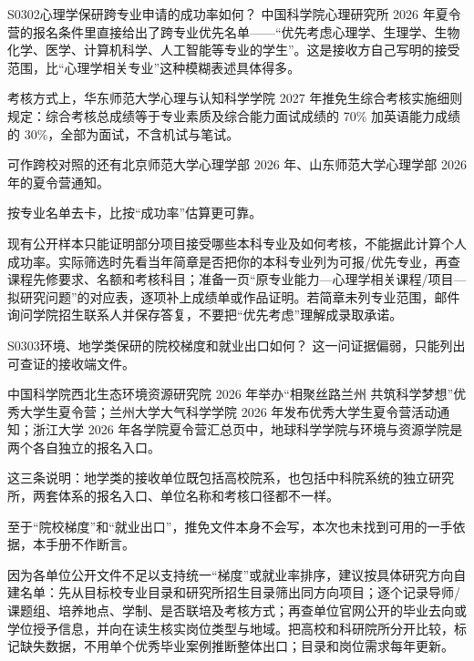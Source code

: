 \begin{qa}{S0302}{心理学保研跨专业申请的成功率如何？}
中国科学院心理研究所 2026 年夏令营的报名条件里直接给出了跨专业优先名单——“优先考虑心理学、生理学、生物化学、医学、计算机科学、人工智能等专业的学生”。这是接收方自己写明的接受范围，比“心理学相关专业”这种模糊表述具体得多。

考核方式上，华东师范大学心理与认知科学学院 2027 年推免生综合考核实施细则规定：综合考核总成绩等于专业素质及综合能力面试成绩的 70\% 加英语能力成绩的 30\%，全部为面试，不含机试与笔试。

可作跨校对照的还有北京师范大学心理学部 2026 年、山东师范大学心理学部 2026 年的夏令营通知。

按专业名单去卡，比按“成功率”估算更可靠。

现有公开样本只能证明部分项目接受哪些本科专业及如何考核，不能据此计算个人成功率。实际筛选时先看当年简章是否把你的本科专业列为可报/优先专业，再查课程先修要求、名额和考核科目；准备一页“原专业能力—心理学相关课程/项目—拟研究问题”的对应表，逐项补上成绩单或作品证明。若简章未列专业范围，邮件询问学院招生联系人并保存答复，不要把“优先考虑”理解成录取承诺。
\end{qa}

\begin{qa}{S0303}{环境、地学类保研的院校梯度和就业出口如何？}
这一问证据偏弱，只能列出可查证的接收端文件。

中国科学院西北生态环境资源研究院 2026 年举办“相聚丝路兰州 共筑科学梦想”优秀大学生夏令营；兰州大学大气科学学院 2026 年发布优秀大学生夏令营活动通知；浙江大学 2026 年各学院夏令营汇总页中，地球科学学院与环境与资源学院是两个各自独立的报名入口。

这三条说明：地学类的接收单位既包括高校院系，也包括中科院系统的独立研究所，两套体系的报名入口、单位名称和考核口径都不一样。

至于“院校梯度”和“就业出口”，推免文件本身不会写，本次也未找到可用的一手依据，本手册不作断言。

因为各单位公开文件不足以支持统一“梯度”或就业率排序，建议按具体研究方向自建名单：先从目标校专业目录和研究所招生目录筛出同方向项目；逐个记录导师/课题组、培养地点、学制、是否联培及考核方式；再查单位官网公开的毕业去向或学位授予信息，并向在读生核实岗位类型与地域。把高校和科研院所分开比较，标记缺失数据，不用单个优秀毕业案例推断整体出口；目录和岗位需求每年更新。
\end{qa}

